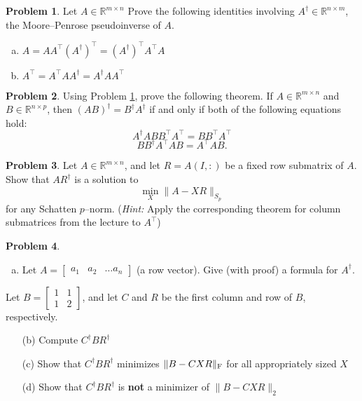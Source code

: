 \documentclass{amsart}[11pt]
\theoremstyle{definition}
\newtheorem{problem}{Problem}
\newcommand{\R}{\mathbb{R}}
\newcommand{\fro}{\textnormal{F}}
\begin{document}
\begin{problem}\label{PROB:Pseudoinverse3}
Let $A\in\R^{m\times n}$ Prove the following identities involving $A^\dagger\in\R^{n\times m}$, the Moore--Penrose pseudoinverse of $A$.		
\begin{enumerate}[(a)]
\item $A = AA^\top(A^\dagger)^\top = (A^\dagger)^\top A^\top A$
\item $A^\top = A^\top AA^\dagger = A^\dagger AA^\top$
\end{enumerate}
\end{problem}

\begin{problem}\label{PROB:Pseudoinverse4}
Using Problem \ref{PROB:Pseudoinverse3}, prove the following theorem. If $A\in\R^{m\times n}$ and $B\in\R^{n\times p}$, then $(AB)^\dagger = B^\dagger A^\dagger$ if and only if both of the following equations hold:
\begin{equation}
A^\dagger ABB^\top A^\top = BB^\top A^\top
\end{equation}
\begin{equation}
BB^\dagger A^\top AB = A^\top AB.
\end{equation}
\end{problem}


\begin{problem}
Let $A\in\R^{m\times n}$, and let $R=A(I,:)$ be a fixed row submatrix of $A$.  Show that $AR^\dagger$ is a solution to
\[\min_{X}\|A-XR\|_{S_p}\]
for any Schatten $p$--norm.  (\textit{Hint:} Apply the corresponding theorem for column submatrices from the lecture to $A^\top$) 
\end{problem}

\begin{problem}
\begin{enumerate}[(a)]
\item Let $A = \begin{bmatrix} a_1 & a_2 & \dots a_n\end{bmatrix}$ (a row vector).  Give (with proof) a formula for $A^\dagger$. 
\end{enumerate}

Let $B = \begin{bmatrix} 1 & 1\\ 1 & 2\end{bmatrix}$, and let $C$ and $R$ be the first column and row of $B$, respectively.
\begin{enumerate}
\item[(b)] Compute $C^\dagger BR^\dagger$
\item[(c)] Show that $C^\dagger BR^\dagger$ minimizes $\|B-CXR\|_{\fro}$ for all appropriately sized $X$
\item[(d)] Show that $C^\dagger BR^\dagger$ is \textbf{not} a minimizer of $\|B-CXR\|_2$
\end{enumerate}
\end{problem}
\end{document}
